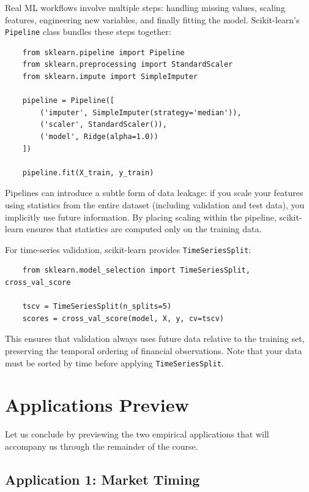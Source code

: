 \documentclass[11pt,a4paper]{article}
\begin{document}
Real ML workflows involve multiple steps: handling missing values, scaling features, engineering new variables, and finally fitting the model. Scikit-learn's \texttt{Pipeline} class bundles these steps together:

\begin{verbatim}
    from sklearn.pipeline import Pipeline
    from sklearn.preprocessing import StandardScaler
    from sklearn.impute import SimpleImputer
    
    pipeline = Pipeline([
        ('imputer', SimpleImputer(strategy='median')),
        ('scaler', StandardScaler()),
        ('model', Ridge(alpha=1.0))
    ])
    
    pipeline.fit(X_train, y_train)
\end{verbatim}

Pipelines can introduce a subtle form of data leakage: if you scale your features using statistics from the entire dataset (including validation and test data), you implicitly use future information. By placing scaling within the pipeline, scikit-learn ensures that statistics are computed only on the training data.

For time-series validation, scikit-learn provides \texttt{TimeSeriesSplit}:
\begin{verbatim}
    from sklearn.model_selection import TimeSeriesSplit, cross_val_score
    
    tscv = TimeSeriesSplit(n_splits=5)
    scores = cross_val_score(model, X, y, cv=tscv)
\end{verbatim}
This ensures that validation always uses future data relative to the training set, preserving the temporal ordering of financial observations. Note that your data must be sorted by time before applying \texttt{TimeSeriesSplit}.

\section{Applications Preview}
Let us conclude by previewing the two empirical applications that will accompany us through the remainder of the course.

\subsection{Application 1: Market Timing}
\end{document}
